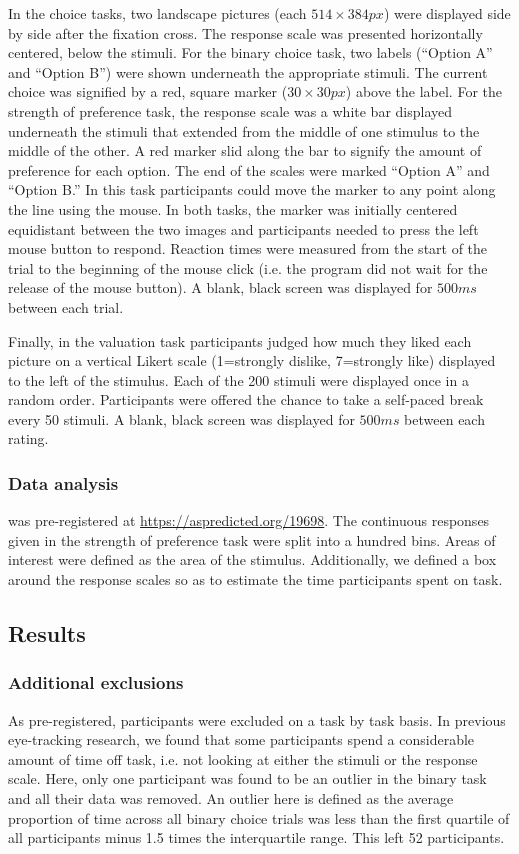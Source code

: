 \documentclass[doc, a4paper, apacite]{apa6}
\begin{document}
In the choice tasks, two landscape pictures (each $514 \times 384px$) were displayed side by side after the fixation cross. The response scale was presented horizontally centered, below the stimuli. For the binary choice task, two labels (``Option A'' and ``Option B'') were shown underneath the appropriate stimuli. The current choice was signified by a red, square marker ($30 \times 30px$) above the label. For the strength of preference task, the response scale was a white bar displayed underneath the stimuli that extended from the middle of one stimulus to the middle of the other. A red marker slid along the bar to signify the amount of preference for each option. The end of the scales were marked ``Option A'' and ``Option B.'' In this task participants could move the marker to any point along the line using the mouse. In both tasks, the marker was initially centered equidistant between the two images and participants needed to press the left mouse button to respond. Reaction times were measured from the start of the trial to the beginning of the mouse click (i.e. the program did not wait for the release of the mouse button). A blank, black screen was displayed for $500ms$ between each trial.

Finally, in the valuation task participants judged how much they liked each picture on a vertical Likert scale (1=strongly dislike, 7=strongly like) displayed to the left of the stimulus. Each of the 200 stimuli were displayed once in a random order. Participants were offered the chance to take a self-paced break every 50 stimuli. A blank, black screen was displayed for $500ms$ between each rating. 

\subsubsection{Data analysis}
 was pre-registered at \url{https://aspredicted.org/19698}.
The continuous responses given in the strength of preference task were split into a hundred bins. Areas of interest were defined as the area of the stimulus. Additionally, we defined a box around the response scales so as to estimate the time participants spent on task. 

\subsection{Results}

\subsubsection{Additional exclusions}
As pre-registered, participants were excluded on a task by task basis. In previous eye-tracking research, we found that some participants spend a considerable amount of time off task, i.e. not looking at either the stimuli or the response scale. Here, only one participant was found to be an outlier in the binary task and all their data was removed. An outlier here is defined as the average proportion of time across all binary choice trials was less than the first quartile of all participants minus 1.5 times the interquartile range. This left 52 participants. 
\end{document}

